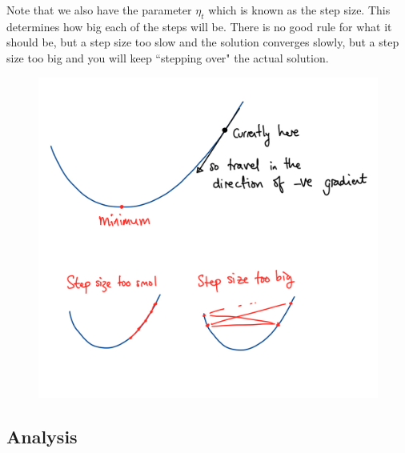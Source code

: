 \documentclass[12pt]{article}
\begin{document}
Note that we also have the parameter $\eta_t$ which is known as the step size. This determines how big each of the steps will be. There is no good rule for what it should be, but  a step size too slow and the solution converges slowly, but a step size too big and you will keep ``stepping over" the actual solution. 

\begin{figure}[H]
	\centering
	\includegraphics[width=0.6\linewidth]{img4}
\end{figure}

\subsection{Analysis}
\end{document}
